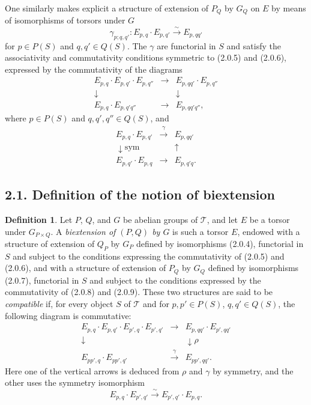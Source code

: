 \documentclass[11pt]{article}
\theoremstyle{plain}
\theoremstyle{definition}
\newtheorem{definition}[theorem]{Definition}
\theoremstyle{remark}
\begin{document}
One similarly makes explicit a structure of extension of $P_Q$ by $G_Q$ on $E$ by means of isomorphisms of torsors under $G$
\begin{equation}
\gamma_{p;q,q'}:E_{p,q}\cdot E_{p,q'}\xrightarrow{\sim}E_{p,qq'}
\tag{2.0.7}
\end{equation}
for $p\in P(S)$ and $q,q'\in Q(S)$. The $\gamma$ are functorial in $S$ and satisfy the associativity and commutativity conditions symmetric to (2.0.5) and (2.0.6), expressed by the commutativity of the diagrams
\begin{equation}
\begin{array}{ccc}
E_{p,q}\cdot E_{p,q'}\cdot E_{p,q''}&\longrightarrow&E_{p,qq'}\cdot E_{p,q''}\\
\downarrow&&\downarrow\\
E_{p,q}\cdot E_{p,q'q''}&\longrightarrow&E_{p,qq'q''},
\end{array}
\tag{2.0.8}
\end{equation}
where $p\in P(S)$ and $q,q',q''\in Q(S)$, and
\begin{equation}
\begin{array}{ccc}
E_{p,q}\cdot E_{p,q'}&\xrightarrow{\gamma}&E_{p,qq'}\\
\downarrow{\scriptstyle \mathrm{sym}}&&\uparrow\\
E_{p,q'}\cdot E_{p,q}&\longrightarrow&E_{p,q'q}.
\end{array}
\tag{2.0.9}
\end{equation}

\subsection*{2.1. Definition of the notion of biextension}

\begin{definition}
Let $P$, $Q$, and $G$ be abelian groups of $\mathcal T$, and let $E$ be a torsor under $G_{P\times Q}$. A \emph{biextension of $(P,Q)$ by $G$} is such a torsor $E$, endowed with a structure of extension of $Q_P$ by $G_P$ defined by isomorphisms (2.0.4), functorial in $S$ and subject to the conditions expressing the commutativity of (2.0.5) and (2.0.6), and with a structure of extension of $P_Q$ by $G_Q$ defined by isomorphisms (2.0.7), functorial in $S$ and subject to the conditions expressed by the commutativity of (2.0.8) and (2.0.9). These two structures are said to be \emph{compatible} if, for every object $S$ of $\mathcal T$ and for $p,p'\in P(S)$, $q,q'\in Q(S)$, the following diagram is commutative:
\begin{equation}
\begin{array}{ccc}
E_{p,q}\cdot E_{p,q'}\cdot E_{p',q}\cdot E_{p',q'}&\longrightarrow&E_{p,qq'}\cdot E_{p',qq'}\\
\downarrow&&\downarrow{\scriptstyle \rho}\\
E_{pp',q}\cdot E_{pp',q'}&\xrightarrow{\gamma}&E_{pp',qq'}.
\end{array}
\tag{2.1.1}
\end{equation}
Here one of the vertical arrows is deduced from $\rho$ and $\gamma$ by symmetry, and the other uses the symmetry isomorphism
\[
E_{p,q}\cdot E_{p',q'}\xrightarrow{\sim}E_{p',q'}\cdot E_{p,q}.
\]
\end{definition}
\end{document}
